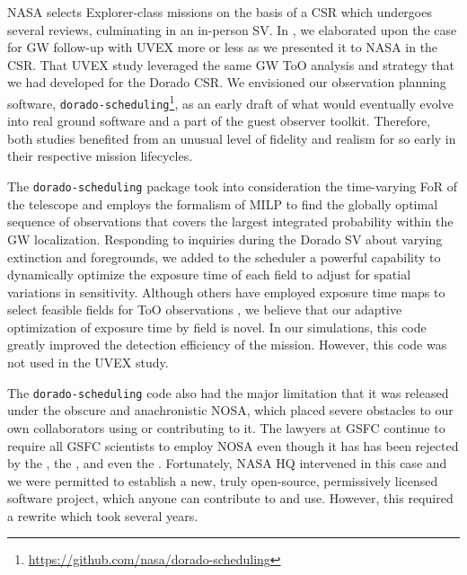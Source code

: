 \documentclass[twocolumn,times]{aastex631}
\begin{document}
NASA selects Explorer-class missions on the basis of a \acf{CSR} which undergoes several reviews, culminating in an in-person \ac{SV}. In \citet{2025arXiv250114109C}, we elaborated upon the case for \ac{GW} follow-up with \ac{UVEX} more or less as we presented it to NASA in the \ac{CSR}. That \ac{UVEX} study leveraged the same \ac{GW} \ac{ToO} analysis and strategy that we had developed for the Dorado \ac{CSR}. We envisioned our observation planning software, \texttt{dorado-scheduling}\footnote{\url{https://github.com/nasa/dorado-scheduling}}, as an early draft of what would eventually evolve into real ground software and a part of the guest observer toolkit. Therefore, both studies benefited from an unusual level of fidelity and realism for so early in their respective mission lifecycles.

The \texttt{dorado-scheduling} package took into consideration the time-varying \ac{FoR} of the telescope and employs the formalism of \ac{MILP} to find the globally optimal sequence of observations that covers the largest integrated probability within the \ac{GW} localization. Responding to inquiries during the Dorado \ac{SV} about varying extinction and foregrounds, we added to the scheduler a powerful capability to dynamically optimize the exposure time of each field to adjust for spatial variations in sensitivity. Although others have employed exposure time maps to select feasible fields for \ac{ToO} observations \citep{2020A&C....3300425H}, we believe that our adaptive optimization of exposure time by field is novel. In our simulations, this code greatly improved the detection efficiency of the mission. However, this code was not used in the \ac{UVEX} study.

The \texttt{dorado-scheduling} code also had the major limitation that it was released under the obscure and anachronistic \ac{NOSA}, which placed severe obstacles to our own collaborators using or contributing to it. The lawyers at \ac{GSFC} continue to require all \ac{GSFC} scientists to employ \ac{NOSA} even though it has has been rejected by the \citet{FSF}, the \citet{NAP25217}, and even the \citet{SMD}. Fortunately, NASA \ac{HQ} intervened in this case and we were permitted to establish a new, truly open-source, permissively licensed software project, which anyone can contribute to and use. However, this required a rewrite which took several years.
\end{document}
